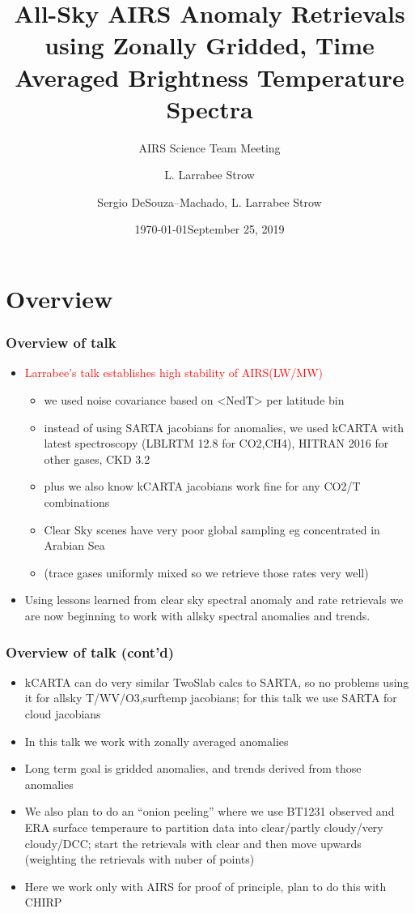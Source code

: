 \documentclass[10pt,t]{beamer}
\author{L. Larrabee Strow}
\date{\today}
\title{\large All-Sky AIRS Anomaly Retrievals \newline
  using Zonally Gridded, Time Averaged \newline
  Brightness Temperature Spectra}
\subtitle{\footnotesize{AIRS Science Team Meeting}}
\date{\vspace{0.1in}\footnotesize{September 25, 2019 \vfill}}
\author{Sergio DeSouza--Machado\inst{1,2}, L. Larrabee Strow\inst{1,2}}
\institute[UMBC]{\inst{1} UMBC Physics Dept. \and \inst{2}UMBC JCET}
\begin{document}
\maketitle
{}



\section{Overview}
\begin{frame}
  \frametitle{Overview of talk}
  \begin{itemize}
  \item \textcolor{red}{Larrabee's talk establishes high stability of AIRS(LW/MW)}
  \begin{itemize}
    \item we used noise covariance based
 on <NedT> per latitude bin 
    \item instead of using SARTA jacobians for anomalies, we used kCARTA with latest spectroscopy
    (LBLRTM 12.8 for CO2,CH4), HITRAN 2016 for other gases, CKD 3.2
    \item plus we also know kCARTA jacobians work fine for any CO2/T combinations
    \item Clear Sky scenes have very poor global sampling eg concentrated in Arabian Sea
    \item (trace gases uniformly mixed so we retrieve those rates very well)
  \end{itemize}
  \item Using lessons learned from clear sky spectral anomaly and rate retrievals 
     we are now beginning to work with  allsky spectral anomalies and trends.
  \end{itemize}
\end{frame}

\begin{frame}
  \frametitle{Overview of talk (cont'd)}
  \begin{itemize}
  \item kCARTA can do very similar TwoSlab calcs to SARTA, so no problems using it for allsky
        T/WV/O3,surftemp jacobians; for this talk we use SARTA for cloud jacobians
  \item In this talk we work with zonally averaged anomalies
  \item Long term goal is gridded anomalies, and trends derived from those anomalies
  \item We also plan to do an ``onion peeling'' where we use BT1231
    observed and ERA surface temperaure to partition data into
    clear/partly cloudy/very cloudy/DCC; start the retrievals with
    clear and then move upwards (weighting the retrievals with nuber
    of points)
  \item Here we work only with AIRS for proof of principle, plan to do this with CHIRP
  \end{itemize}
\end{frame}
\end{document}

